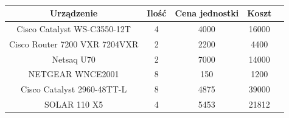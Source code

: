 \paragraph{}
\begin{center}
    \begin{tabular}{|c|c|c|c|c|}
    \hline
    Urządzenie &	Ilość&	Cena jednostki	& Koszt \\ \hline
Cisco Catalyst WS-C3550-12T &	4	&4000	&16000 \\ \hline
Cisco Router 7200 VXR 7204VXR&	2	&2200	&4400\\ \hline
Netsaq U70	&2	&7000	&14000\\ \hline
NETGEAR WNCE2001	&8	&150	&1200\\ \hline
Cisco Catalyst 2960-48TT-L	&8	&4875	&39000\\ \hline
SOLAR 110 X5 	&4	&5453	&21812\\ \hline

\end{tabular}
\end{center}

